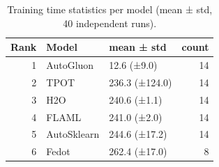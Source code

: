 \begin{table}
\caption{Training time statistics per model (mean ± std, 40 independent runs).}
\label{tab:training_times}
\begin{tabular}{rllr}
\toprule
Rank & Model & mean ± std & count \\
\midrule
1 & AutoGluon & 12.6 (±9.0) & 14 \\
2 & TPOT & 236.3 (±124.0) & 14 \\
3 & H2O & 240.6 (±1.1) & 14 \\
4 & FLAML & 241.0 (±2.0) & 14 \\
5 & AutoSklearn & 244.6 (±17.2) & 14 \\
6 & Fedot & 262.4 (±17.0) & 8 \\
\bottomrule
\end{tabular}
\end{table}
